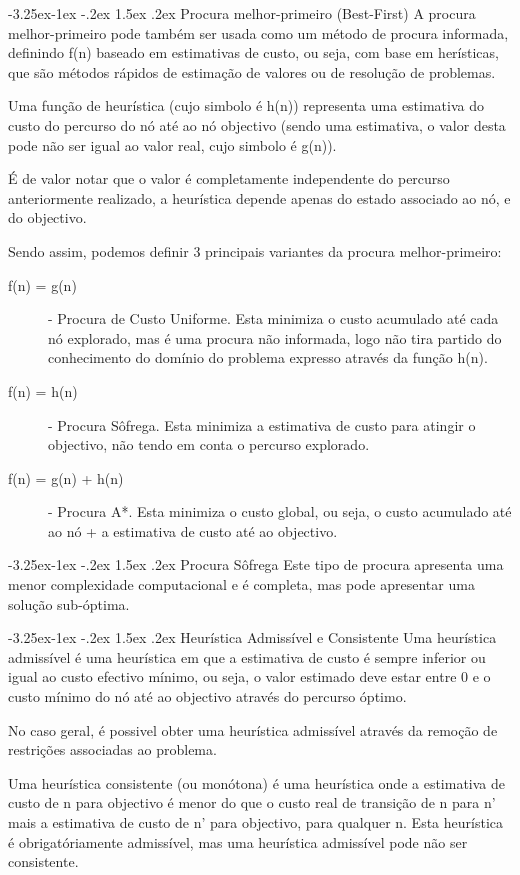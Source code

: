 \documentclass[a4paper,12pt]{article}
\makeatletter
\renewcommand\subparagraph{\@startsection{subparagraph}{5}{\z@}%
                {-3.25ex\@plus -1ex \@minus -.2ex}%
                {1.5ex \@plus .2ex}%
                {\normalfont\normalsize\bfseries}}
\makeatother
\begin{document}
\subparagraph{Procura melhor-primeiro (Best-First)}
A procura melhor-primeiro pode também ser usada como um método de procura informada, definindo f(n) baseado em estimativas de custo, ou seja, com base em herísticas, que são métodos rápidos de estimação de valores ou de resolução de problemas.

Uma função de heurística (cujo simbolo é h(n)) representa uma estimativa do custo do percurso do nó até ao nó objectivo (sendo uma estimativa, o valor desta pode não ser igual ao valor real, cujo simbolo é g(n)).

É de valor notar que o valor é completamente independente do percurso anteriormente realizado, a heurística depende apenas do estado associado ao nó, e do objectivo.

Sendo assim, podemos definir 3 principais variantes da procura melhor-primeiro:

\begin{description}
	\item[f(n) = g(n)] - Procura de Custo Uniforme. Esta minimiza o custo acumulado até cada nó explorado, mas é uma procura não informada, logo não tira partido do conhecimento do domínio do problema expresso através da função h(n).
	\item[f(n) = h(n)] - Procura Sôfrega. Esta minimiza a estimativa de custo para atingir o objectivo, não tendo em conta o percurso explorado.
	\item[f(n) = g(n) + h(n)] - Procura A*. Esta minimiza o custo global, ou seja, o custo acumulado até ao nó + a estimativa de custo até ao objectivo.
\end{description}

\subparagraph{Procura Sôfrega}
Este tipo de procura apresenta uma menor complexidade computacional e é completa, mas pode apresentar uma solução sub-óptima.

\subparagraph{Heurística Admissível e Consistente}
Uma heurística admissível é uma heurística em que a estimativa de custo é sempre inferior ou igual ao custo efectivo mínimo, ou seja, o valor estimado deve estar entre 0 e o custo mínimo do nó até ao objectivo através do percurso óptimo.

No caso geral, é possivel obter uma heurística admissível através da remoção de restrições associadas ao problema.

Uma heurística consistente (ou monótona) é uma heurística onde a estimativa de custo de n para objectivo é menor do que o custo real de transição de n para n' mais a estimativa de custo de n' para objectivo, para qualquer n.
Esta heurística é obrigatóriamente admissível, mas uma heurística admissível pode não ser consistente.
\end{document}
